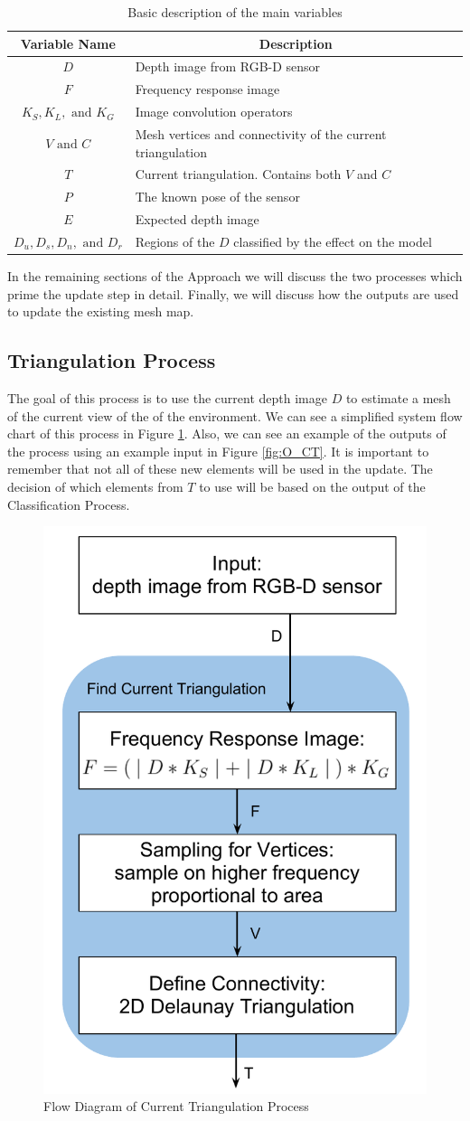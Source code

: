 \documentclass[12pt]{article}
\begin{document}
\begin{table}[h]
\begin{center}
\begin{tabular}{|c|l|}
\hline
{\bf Variable Name} & \multicolumn{1}{|c|}{{\bf Description}} \\
\hline
\rowcolor{LightGray} $D$ & Depth image from RGB-D sensor \\ 
$F$ & Frequency response image \\
\rowcolor{LightGray} $K_S,K_L,\text{ and }K_G$ & Image convolution operators \\
$V \text{ and } C$ & Mesh vertices and connectivity of the current triangulation \\
\rowcolor{LightGray} $T$ & Current triangulation. Contains both $V$ and $C$ \\
$P$ & The known pose of the sensor \\
\rowcolor{LightGray} $E$ & Expected depth image \\ 
$D_u,D_s,D_n,\text{ and } D_r$ & Regions of the $D$ classified by the
effect on the model \\ 
\hline
\end{tabular}
\end{center}
\caption{Basic description of the main variables}
\label{tab:var}
\end{table}

In the remaining sections of the Approach we will discuss the two
processes which prime the update step in detail. Finally, we will
discuss how the outputs are used to update the existing mesh map.

\subsection{Triangulation Process}

The goal of this process is to use the current depth image $D$ to estimate a
mesh of the current view of the of the environment. We can see a
simplified system flow chart of this process in Figure \ref{fig:SD_CT}.
Also, we can see an example of the outputs of the process using an
example input in Figure \ref{fig:O_CT}. It is important to
remember that not all of these new elements will be used in the update.
The decision of which elements from $T$ to use will be based on the
output of the Classification Process. 

\begin{figure}[h!]
  \centering
    \includegraphics[height=0.5\textwidth]{SD_CT.pdf}
  \caption{Flow Diagram of Current Triangulation Process}
  \label{fig:SD_CT}
\end{figure}
\end{document}
